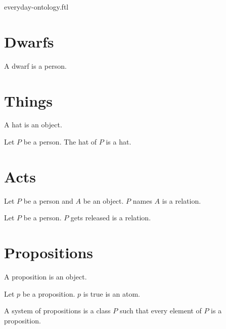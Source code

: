 \documentclass{stex}
\begin{document}
\begin{smodule}{everyday-ontology.ftl}
  \section*{Dwarfs}

  \begin{fsignature*}
    A dwarf is a person.
  \end{fsignature*}


  \section*{Things}

  \begin{fsignature*}
    A hat is an object.
  \end{fsignature*}

  \begin{fsignature*}
    Let $P$ be a person.
    The hat of $P$ is a hat.
  \end{fsignature*}


  \section*{Acts}

  \begin{fsignature*}
    Let $P$ be a person and $A$ be an object.
    $P$ names $A$ is a relation.
  \end{fsignature*}

  \begin{fsignature*}
    Let $P$ be a person.
    $P$ gets released is a relation.
  \end{fsignature*}


  \section*{Propositions}

  \begin{fsignature*}
    A proposition is an object.
  \end{fsignature*}

  \begin{fsignature*}
    Let $p$ be a proposition.
    $p$ is true is an atom.
  \end{fsignature*}

  \begin{fdefinition*}
    A system of propositions is a class $P$ such that every element of $P$ is a proposition.
  \end{fdefinition*}
\end{smodule}
\end{document}
